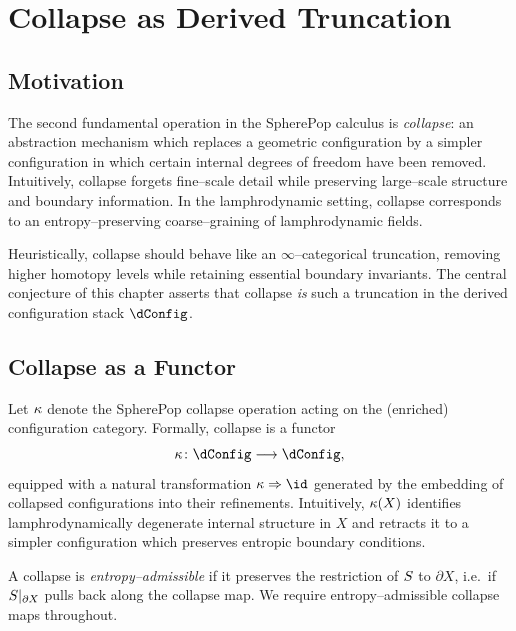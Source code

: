 
\chapter{Collapse as Derived Truncation}
\label{chap:collapse-truncation}

\section{Motivation}

The second fundamental operation in the SpherePop calculus is
\emph{collapse}: an abstraction mechanism which replaces a geometric
configuration by a simpler configuration in which certain internal
degrees of freedom have been removed. Intuitively, collapse forgets
fine--scale detail while preserving large--scale structure and boundary
information. In the lamphrodynamic setting, collapse corresponds to an
entropy--preserving coarse--graining of lamphrodynamic fields.

Heuristically, collapse should behave like an $\infty$--categorical
truncation, removing higher homotopy levels while retaining essential
boundary invariants. The central conjecture of this chapter asserts
that collapse \emph{is} such a truncation in the derived configuration
stack $\dConfig$.

\section{Collapse as a Functor}

Let $\kappa$ denote the SpherePop collapse operation acting on the
(enriched) configuration category. Formally, collapse is a functor
\[
  \Collapse \colon \dConfig \longrightarrow \dConfig,
\]
equipped with a natural transformation $\Collapse \Rightarrow \id$
generated by the embedding of collapsed configurations into their
refinements. Intuitively, $\kappa(X)$ identifies lamphrodynamically
degenerate internal structure in $X$ and retracts it to a simpler
configuration which preserves entropic boundary conditions.

\begin{definition}
A collapse is \emph{entropy--admissible} if it preserves the
restriction of $S$ to $\partial X$, i.e.\ if
$S|_{\partial X}$ pulls back along the collapse map. We require
entropy--admissible collapse maps throughout.
\end{definition}

